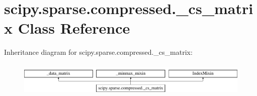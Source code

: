 \hypertarget{classscipy_1_1sparse_1_1compressed_1_1__cs__matrix}{}\section{scipy.\+sparse.\+compressed.\+\_\+cs\+\_\+matrix Class Reference}
\label{classscipy_1_1sparse_1_1compressed_1_1__cs__matrix}
Inheritance diagram for scipy.\+sparse.\+compressed.\+\_\+cs\+\_\+matrix\+:\begin{figure}[H]
\begin{center}
\leavevmode
\includegraphics[height=1.637427cm]{classscipy_1_1sparse_1_1compressed_1_1__cs__matrix}
\end{center}
\end{figure}
